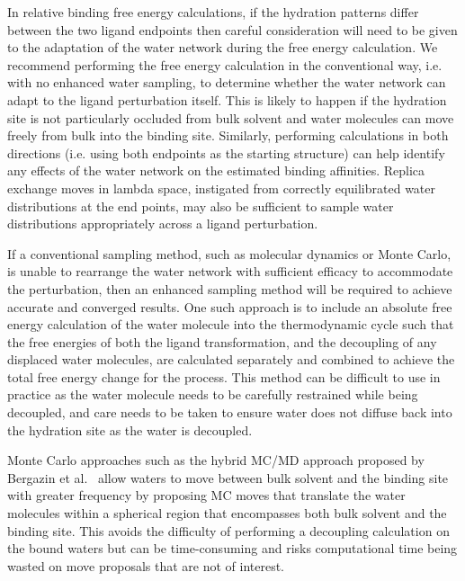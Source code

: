 \documentclass[9pt,bestpractices]{livecoms}
\begin{document}
In relative binding free energy calculations, if the hydration patterns differ between the two ligand endpoints then careful consideration will need to be given to the adaptation of the water network during the free energy calculation. We recommend performing the free energy calculation in the conventional way, i.e. with no enhanced water sampling, to determine whether the water network can adapt to the ligand perturbation itself. This is likely to happen if the hydration site is not particularly occluded from bulk solvent and water molecules can move freely from bulk into the binding site. Similarly, performing calculations in both directions (i.e. using both endpoints as the starting structure) can help identify any effects of the water network on the estimated binding affinities. Replica exchange moves in lambda space, instigated from correctly equilibrated water distributions at the end points, may also be sufficient to sample water distributions appropriately across a ligand perturbation.

If a conventional sampling method, such as molecular dynamics or Monte Carlo, is unable to rearrange the water network with sufficient efficacy to accommodate the perturbation, then an enhanced sampling method will be required to achieve accurate and converged results. One such approach is to include an absolute free energy calculation of the water molecule into the thermodynamic cycle\cite{ross2020enhancing, hamelberg2004standard, barillari2007classification, yu2008free, ge2022abfewat} such that the free energies of both the ligand transformation, and the decoupling of any displaced water molecules, are calculated separately and combined to achieve the total free energy change for the process. This method can be difficult to use in practice as the water molecule needs to be carefully restrained while being decoupled, and care needs to be taken to ensure water does not diffuse back into the hydration site as the water is decoupled.

Monte Carlo approaches such as the hybrid MC/MD approach proposed by Bergazin et al.~\cite{bergazin2021enhancing, ben-shalom2021fast, ge2022enhancing} allow waters to move between bulk solvent and the binding site with greater frequency by proposing MC moves that translate the water molecules within a spherical region that encompasses both bulk solvent and the binding site. This avoids the difficulty of performing a decoupling calculation on the bound waters but can be time-consuming and risks computational time being wasted on move proposals that are not of interest.
\end{document}
